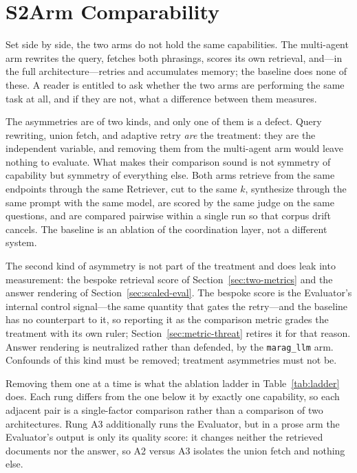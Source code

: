 \documentclass[acmsmall,anonymous,screen]{acmart}
\begin{document}
\section*{S2\quad Arm Comparability}


Set side by side, the two arms do not hold the same capabilities. The
multi-agent arm rewrites the query, fetches both phrasings, scores its own
retrieval, and---in the full architecture---retries and accumulates memory; the
baseline does none of these. A reader is entitled to ask whether the two arms
are performing the same task at all, and if they are not, what a difference
between them measures.

The asymmetries are of two kinds, and only one of them is a defect. Query
rewriting, union fetch, and adaptive retry \emph{are} the treatment: they are
the independent variable, and removing them from the multi-agent arm would
leave nothing to evaluate. What makes their comparison sound is not symmetry of
capability but symmetry of everything else. Both arms retrieve from the same
endpoints through the same Retriever, cut to the same $k$, synthesize through
the same prompt with the same model, are scored by the same judge on the same
questions, and are compared pairwise within a single run so that corpus drift
cancels. The baseline is an ablation of the coordination layer, not a different
system.

The second kind of asymmetry is not part of the treatment and does leak into
measurement: the bespoke retrieval score of Section~\ref{sec:two-metrics} and
the answer rendering of Section~\ref{sec:scaled-eval}. The bespoke score is the
Evaluator's internal control signal---the same quantity that gates the
retry---and the baseline has no counterpart to it, so reporting it as the
comparison metric grades the treatment with its own ruler; Section~\ref{sec:metric-threat}
retires it for that reason. Answer rendering is neutralized rather than
defended, by the \texttt{marag\_llm} arm. Confounds of this kind must be
removed; treatment asymmetries must not be.

Removing them one at a time is what the ablation ladder in
Table~\ref{tab:ladder} does. Each rung differs from the one below it by exactly
one capability, so each adjacent pair is a single-factor comparison rather than
a comparison of two architectures. Rung A3 additionally runs the Evaluator, but
in a prose arm the Evaluator's output is only its quality score: it changes
neither the retrieved documents nor the answer, so A2 versus A3 isolates the
union fetch and nothing else.
\end{document}

